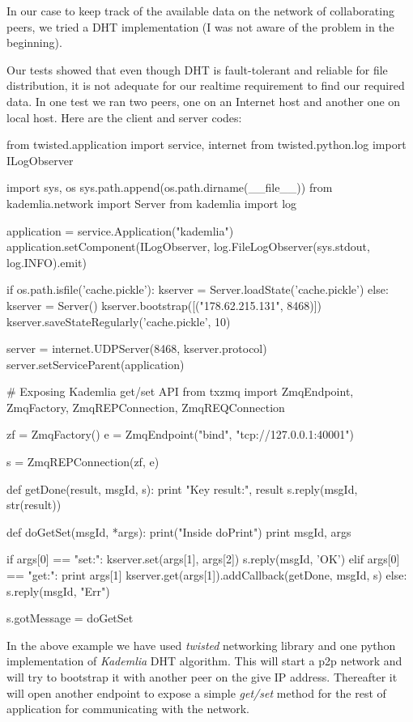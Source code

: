 In our case to keep track of the available data on the network of collaborating peers, we tried a DHT implementation 
(I was not aware of the problem in the beginning).

Our tests showed that even though DHT is fault-tolerant and reliable for file distribution,
it is not adequate for our realtime requirement to find our required data. In one test we ran two peers,
one on an Internet host and another one on local host. Here are the client and server codes:

\begin{python}
from twisted.application import service, internet
from twisted.python.log import ILogObserver

import sys, os
sys.path.append(os.path.dirname(__file__))
from kademlia.network import Server
from kademlia import log

application = service.Application("kademlia")
application.setComponent(ILogObserver, 
	log.FileLogObserver(sys.stdout, log.INFO).emit)

if os.path.isfile('cache.pickle'):
    kserver = Server.loadState('cache.pickle')
else:
    kserver = Server()
    kserver.bootstrap([("178.62.215.131", 8468)])
kserver.saveStateRegularly('cache.pickle', 10)

server = internet.UDPServer(8468, kserver.protocol)
server.setServiceParent(application)


# Exposing Kademlia get/set API
from txzmq import ZmqEndpoint, ZmqFactory, ZmqREPConnection,
 ZmqREQConnection

zf = ZmqFactory()
e = ZmqEndpoint("bind", "tcp://127.0.0.1:40001")

s = ZmqREPConnection(zf, e)

def getDone(result, msgId, s):
    print "Key result:", result
    s.reply(msgId, str(result))

def doGetSet(msgId, *args):
    print("Inside doPrint")
    print msgId, args

    if args[0] == "set:":
        kserver.set(args[1], args[2])
        s.reply(msgId, 'OK')
    elif args[0] == "get:":
        print args[1]
        kserver.get(args[1]).addCallback(getDone, msgId, s)
    else:
        s.reply(msgId, "Err")

s.gotMessage = doGetSet
\end{python}

In the above example we have used \textit{twisted} networking library\cite{TwistedMatrix} and one
python implementation\cite{KademliaImpl} of \textit{Kademlia} DHT algorithm\cite{KademliaPaper}. 
This will start a p2p network and will try to bootstrap it with another peer on the give IP address.
Thereafter it will open another endpoint to expose a simple \textit{get/set} method for the rest of
application for communicating with the network.

